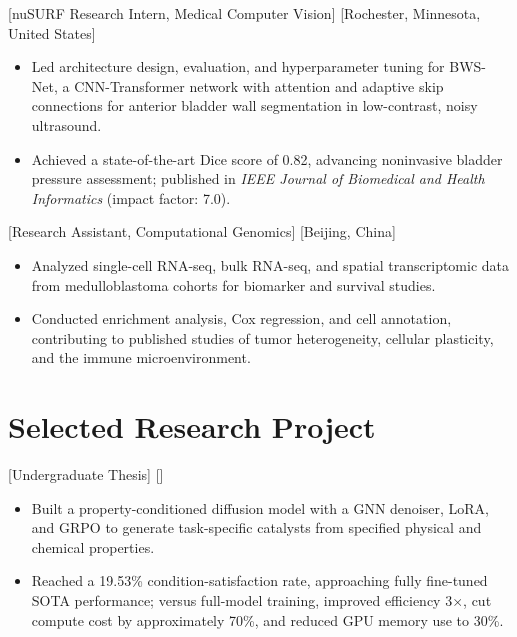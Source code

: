 \documentclass{chicv}
\begin{document}
  [nuSURF Research Intern, Medical Computer Vision]
  [Rochester, Minnesota, United States]
  \begin{itemize}
    \item Led architecture design, evaluation, and hyperparameter tuning for BWS-Net, a
      CNN-Transformer network with attention and adaptive skip connections for anterior bladder
      wall segmentation in low-contrast, noisy ultrasound.
    \item Achieved a state-of-the-art Dice score of 0.82, advancing noninvasive bladder pressure
      assessment; published in \textit{IEEE Journal of Biomedical and Health Informatics}
      (impact factor: 7.0).
  \end{itemize}

  [Research Assistant, Computational Genomics]
  [Beijing, China]
  \begin{itemize}
    \item Analyzed single-cell RNA-seq, bulk RNA-seq, and spatial transcriptomic data from
      medulloblastoma cohorts for biomarker and survival studies.
    \item Conducted enrichment analysis, Cox regression, and cell annotation, contributing to
      published studies of tumor heterogeneity, cellular plasticity, and the immune microenvironment.
  \end{itemize}

\section{Selected Research Project}
  [Undergraduate Thesis]
  []
  \begin{itemize}
    \item Built a property-conditioned diffusion model with a GNN denoiser, LoRA, and GRPO to
      generate task-specific catalysts from specified physical and chemical properties.
    \item Reached a 19.53\% condition-satisfaction rate, approaching fully fine-tuned SOTA
      performance; versus full-model training, improved efficiency 3$\times$, cut compute cost by
      approximately 70\%, and reduced GPU memory use to 30\%.
  \end{itemize}

\newpage
\end{document}

